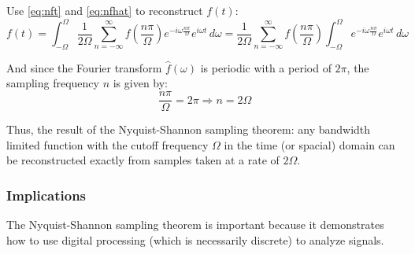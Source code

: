 \documentclass[12pt]{article}
\newcommand{\inftyint}{\int_{-\infty}^{\infty}}
\begin{document}
Use \eqref{eq:nft} and \eqref{eq:nfhat} to reconstruct \( f(t)  \):
\begin{equation}
\label{eq:ndtft}
f(t) = \int_{-\Omega}^{\Omega} \frac{1}{2\Omega} \sum_{n = -\infty}^{\infty} f(\frac{n\pi}{\Omega})e^{-i \omega \frac{n \pi}{\Omega} } e^{i\omega t} \,d\omega = \frac{1}{2\Omega} \sum_{n = -\infty}^{\infty} f(\frac{n\pi}{\Omega}) \int_{-\Omega}^{\Omega} e^{-i \omega \frac{n \pi}{\Omega} } e^{i\omega t} \, d\omega
\end{equation}

And since the Fourier transform \( \hat{f}(\omega) \) is periodic with a period of \( 2\pi\), the sampling frequency \( n\) is given by:
\[ \frac{n\pi}{\Omega} = 2\pi \Rightarrow n = 2\Omega\]

Thus, the result of the Nyquist-Shannon sampling theorem: any bandwidth limited function with the cutoff frequency \( \Omega \) in the time (or spacial) domain can be reconstructed exactly from samples taken at a rate of \( 2\Omega \).

%
%


\subsubsection{Implications}

The Nyquist-Shannon sampling theorem is important because it demonstrates how to use digital processing (which is necessarily discrete) to analyze signals. 
\end{document}
